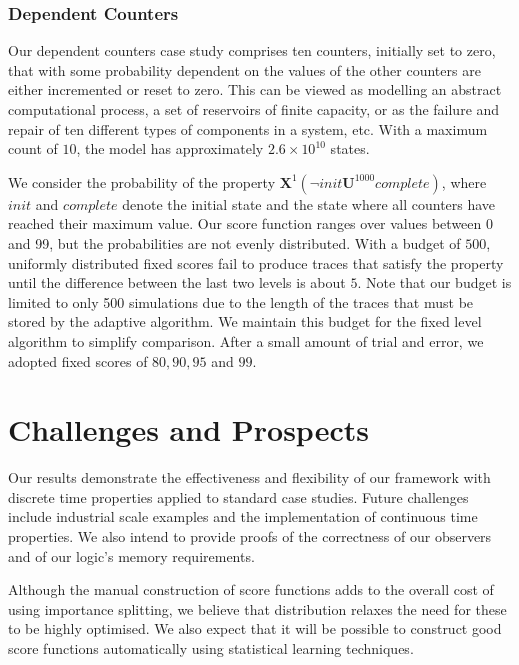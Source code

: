 \documentclass{llncs}
\begin{document}
\begin{figure}
\begin{minipage}[t]{0.5\columnwidth}
\end{minipage}
\end{figure}


\vspace{-1em}



\subsubsection*{Dependent Counters}

Our dependent counters case study comprises ten counters, initially
set to zero, that with some probability dependent on the values of
the other counters are either incremented or reset to zero. This can
be viewed as modelling an abstract computational process, a set of
reservoirs of finite capacity, or as the failure and repair of ten
different types of components in a system, etc. With a maximum count
of $10$, the model has approximately $2.6\times10^{10}$ states.

We consider the probability of the property $\mathbf{X}^{1}(\neg\mathit{init}\mathbf{U}^{1000}\mathit{complete})$,
where $\mathit{init}$ and $\mathit{complete}$ denote the initial
state and the state where all counters have reached their maximum
value. Our score function ranges over values between 0 and 99, but
the probabilities are not evenly distributed. With a budget of $500$,
uniformly distributed fixed scores fail to produce traces that satisfy
the property until the difference between the last two levels is about
$5$. Note that our budget is limited to only 500 simulations due
to the length of the traces that must be stored by the adaptive algorithm.
We maintain this budget for the fixed level algorithm to simplify
comparison. After a small amount of trial and error, we adopted fixed
scores of $80,90,95$ and $99$. 


\section{Challenges and Prospects}

Our results demonstrate the effectiveness and flexibility of our framework
with discrete time properties applied to standard case studies. Future
challenges include industrial scale examples and the implementation
of continuous time properties. We also intend to provide proofs of
the correctness of our observers and of our logic's memory requirements.

Although the manual construction of score functions adds to the overall
cost of using importance splitting, we believe that distribution relaxes
the need for these to be highly optimised. We also expect that it
will be possible to construct good score functions automatically using
statistical learning techniques.



\end{document}
